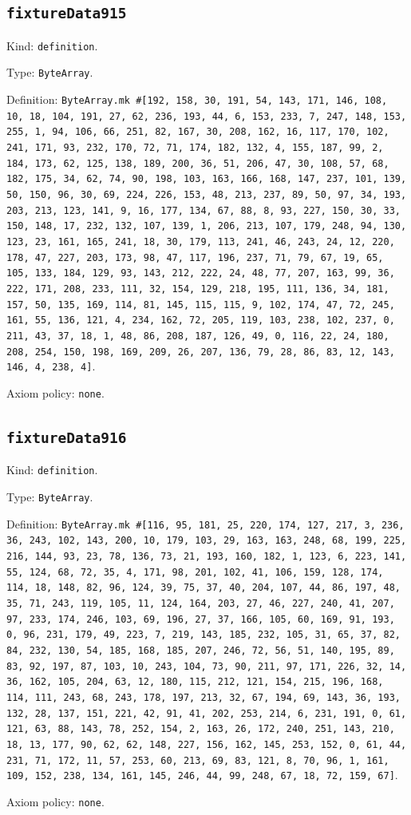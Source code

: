 \documentclass[11pt]{article}
\begin{document}
\subsection*{\texttt{fixtureData915}}
\noindent Kind: \texttt{definition}.\par
\noindent Type: \texttt{ByteArray}.\par
\noindent Definition: \texttt{ByteArray.mk \#[192, 158, 30, 191, 54, 143, 171, 146, 108, 10, 18, 104, 191, 27, 62, 236, 193, 44, 6, 153, 233, 7, 247, 148, 153, 255, 1, 94, 106, 66, 251, 82, 167, 30, 208, 162, 16, 117, 170, 102, 241, 171, 93, 232, 170, 72, 71, 174, 182, 132, 4, 155, 187, 99, 2, 184, 173, 62, 125, 138, 189, 200, 36, 51, 206, 47, 30, 108, 57, 68, 182, 175, 34, 62, 74, 90, 198, 103, 163, 166, 168, 147, 237, 101, 139, 50, 150, 96, 30, 69, 224, 226, 153, 48, 213, 237, 89, 50, 97, 34, 193, 203, 213, 123, 141, 9, 16, 177, 134, 67, 88, 8, 93, 227, 150, 30, 33, 150, 148, 17, 232, 132, 107, 139, 1, 206, 213, 107, 179, 248, 94, 130, 123, 23, 161, 165, 241, 18, 30, 179, 113, 241, 46, 243, 24, 12, 220, 178, 47, 227, 203, 173, 98, 47, 117, 196, 237, 71, 79, 67, 19, 65, 105, 133, 184, 129, 93, 143, 212, 222, 24, 48, 77, 207, 163, 99, 36, 222, 171, 208, 233, 111, 32, 154, 129, 218, 195, 111, 136, 34, 181, 157, 50, 135, 169, 114, 81, 145, 115, 115, 9, 102, 174, 47, 72, 245, 161, 55, 136, 121, 4, 234, 162, 72, 205, 119, 103, 238, 102, 237, 0, 211, 43, 37, 18, 1, 48, 86, 208, 187, 126, 49, 0, 116, 22, 24, 180, 208, 254, 150, 198, 169, 209, 26, 207, 136, 79, 28, 86, 83, 12, 143, 146, 4, 238, 4]}.\par
\noindent Axiom policy: \texttt{none}.\par
\subsection*{\texttt{fixtureData916}}
\noindent Kind: \texttt{definition}.\par
\noindent Type: \texttt{ByteArray}.\par
\noindent Definition: \texttt{ByteArray.mk \#[116, 95, 181, 25, 220, 174, 127, 217, 3, 236, 36, 243, 102, 143, 200, 10, 179, 103, 29, 163, 163, 248, 68, 199, 225, 216, 144, 93, 23, 78, 136, 73, 21, 193, 160, 182, 1, 123, 6, 223, 141, 55, 124, 68, 72, 35, 4, 171, 98, 201, 102, 41, 106, 159, 128, 174, 114, 18, 148, 82, 96, 124, 39, 75, 37, 40, 204, 107, 44, 86, 197, 48, 35, 71, 243, 119, 105, 11, 124, 164, 203, 27, 46, 227, 240, 41, 207, 97, 233, 174, 246, 103, 69, 196, 27, 37, 166, 105, 60, 169, 91, 193, 0, 96, 231, 179, 49, 223, 7, 219, 143, 185, 232, 105, 31, 65, 37, 82, 84, 232, 130, 54, 185, 168, 185, 207, 246, 72, 56, 51, 140, 195, 89, 83, 92, 197, 87, 103, 10, 243, 104, 73, 90, 211, 97, 171, 226, 32, 14, 36, 162, 105, 204, 63, 12, 180, 115, 212, 121, 154, 215, 196, 168, 114, 111, 243, 68, 243, 178, 197, 213, 32, 67, 194, 69, 143, 36, 193, 132, 28, 137, 151, 221, 42, 91, 41, 202, 253, 214, 6, 231, 191, 0, 61, 121, 63, 88, 143, 78, 252, 154, 2, 163, 26, 172, 240, 251, 143, 210, 18, 13, 177, 90, 62, 62, 148, 227, 156, 162, 145, 253, 152, 0, 61, 44, 231, 71, 172, 11, 57, 253, 60, 213, 69, 83, 121, 8, 70, 96, 1, 161, 109, 152, 238, 134, 161, 145, 246, 44, 99, 248, 67, 18, 72, 159, 67]}.\par
\noindent Axiom policy: \texttt{none}.\par
\end{document}
